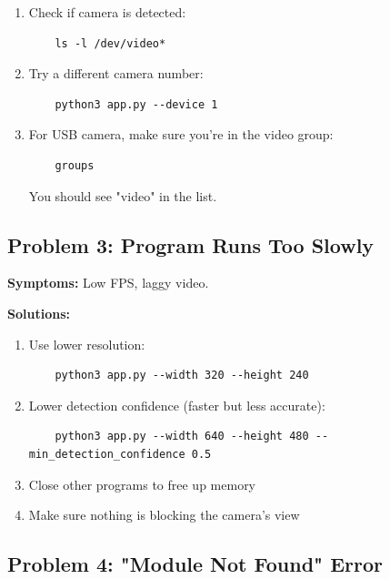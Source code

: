 \documentclass[12pt,a4paper]{article}
\begin{document}
\begin{enumerate}
    \item Check if camera is detected:
    \begin{lstlisting}
    ls -l /dev/video*
    \end{lstlisting}
    
    \item Try a different camera number:
    \begin{lstlisting}
    python3 app.py --device 1
    \end{lstlisting}
    
    \item For USB camera, make sure you're in the video group:
    \begin{lstlisting}
    groups
    \end{lstlisting}
    You should see "video" in the list.
\end{enumerate}

\subsection{Problem 3: Program Runs Too Slowly}

\textbf{Symptoms:} Low FPS, laggy video.

\textbf{Solutions:}

\begin{enumerate}
    \item Use lower resolution:
    \begin{lstlisting}
    python3 app.py --width 320 --height 240
    \end{lstlisting}
    
    \item Lower detection confidence (faster but less accurate):
    \begin{lstlisting}
    python3 app.py --width 640 --height 480 --min_detection_confidence 0.5
    \end{lstlisting}
    
    \item Close other programs to free up memory
    
    \item Make sure nothing is blocking the camera's view
\end{enumerate}

\subsection{Problem 4: "Module Not Found" Error}
\end{document}
